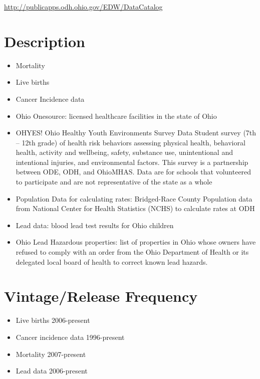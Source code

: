 \documentclass[
]{book}
\providecommand{\tightlist}{%
  \setlength{\itemsep}{0pt}\setlength{\parskip}{0pt}}
\begin{document}
\url{http://publicapps.odh.ohio.gov/EDW/DataCatalog}

\hypertarget{description-86}{%
\section{Description}\label{description-86}}

\begin{itemize}
\tightlist
\item
  Mortality
\item
  Live births
\item
  Cancer Incidence data
\item
  Ohio Onesource: licensed healthcare facilities in the state of Ohio
\item
  OHYES! Ohio Healthy Youth Environments Survey Data Student survey (7th -- 12th grade) of health risk behaviors assessing physical health, behavioral health, activity and wellbeing, safety, substance use, unintentional and intentional injuries, and environmental factors. This survey is a partnership between ODE, ODH, and OhioMHAS. Data are for schools that volunteered to participate and are not representative of the state as a whole
\item
  Population Data for calculating rates: Bridged-Race County Population data from National Center for Health Statistics (NCHS) to calculate rates at ODH
\item
  Lead data: blood lead test results for Ohio children
\item
  Ohio Lead Hazardous properties: list of properties in Ohio whose owners have refused to comply with an order from the Ohio Department of Health or its delegated local board of health to correct known lead hazards.
\end{itemize}

\hypertarget{vintagerelease-frequency-86}{%
\section{Vintage/Release Frequency}\label{vintagerelease-frequency-86}}

\begin{itemize}
\tightlist
\item
  Live births 2006-present
\item
  Cancer incidence data 1996-present
\item
  Mortality 2007-present
\item
  Lead data 2006-present
\end{itemize}
\end{document}
